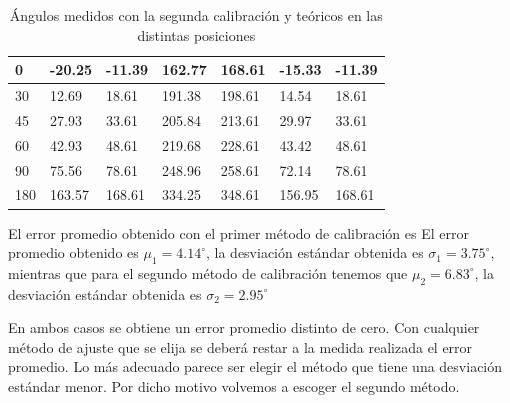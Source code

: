 \documentclass[main]{subfiles}
\begin{document}
\begin{table}
\begin{tabular}{|p{50pt}|p{50pt}|p{50pt}|p{50pt}|p{51pt}|p{50pt}|p{50pt}|}
 0    &    -20.25  & -11.39& 162.77& 168.61&-15.33 & -11.39\\ \hline
 30   &   12.69    & 18.61& 191.38& 198.61&14.54 & 18.61 \\ \hline
 45   &   27.93 	  &	33.61 & 205.84 & 213.61 & 29.97 & 33.61 \\ \hline
 60   &   42.93 	  & 48.61 & 219.68 & 228.61 & 43.42 & 48.61 \\ \hline
 90   &   75.56 	  & 78.61 & 248.96 & 258.61 & 72.14 & 78.61 \\ \hline
 180  &   163.57	  &	168.61& 334.25 & 348.61 & 156.95 & 168.61 \\ \hline
 
\end{tabular}
\caption{Ángulos medidos con la segunda calibración y teóricos en las distintas posiciones}
\label{tab:angulos}
\end{table} 


El error promedio obtenido con el primer método de calibración es 
El error promedio obtenido es $\mu_1=4.14^\circ$, la desviación estándar obtenida es $\sigma_1
=3.75^\circ$, mientras que para el segundo método de calibración tenemos que $\mu_2=6.83^\circ$, la desviación estándar obtenida es $\sigma_2
=2.95^\circ$

En ambos casos se obtiene un error promedio distinto de cero. Con cualquier método de ajuste que se elija se deberá restar a la medida realizada el error promedio. Lo más adecuado parece ser elegir el método que tiene una desviación estándar menor. Por dicho motivo volvemos a escoger el segundo método. 
\end{document}

